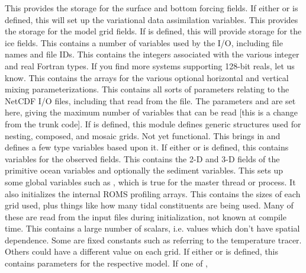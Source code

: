 \begin{klist}
   This
    provides the storage for the surface and bottom forcing fields.
   If either  or 
    is defined, this will set up the variational data assimilation
    variables.
   This provides the storage for the model grid fields. 
   If  is defined, this will provide
    storage for the ice fields.
   This contains a number of variables used by the
    I/O, including file names and file IDs.
    This contains the integers associated with the
    various integer and real Fortran types. If you find more systems
    supporting 128-bit reals, let us know.
   This contains the arrays for the various
    optional horizontal and vertical mixing parameterizations.
   This contains all sorts of parameters relating to
    the NetCDF I/O files, including that read from the 
    file. The parameters  and  are set here, giving
    the maximum number of variables that can be read [this is a change
    from the trunk code].
   If  is defined, this module defines
    generic structures used for nesting, composed, and mosaic grids. Not
    yet functional.
   This brings in  and defines a few
    type variables based upon it.
   If either  or 
    is defined, this contains variables for the observed fields.
   This contains the 2-D and 3-D fields of the primitive
    ocean variables and optionally the sediment variables.
   This sets up some global variables such as
    , which is true for the master thread or
    process. It also initializes the internal ROMS profiling arrays.
   This contains the sizes of each grid used, plus
    things like how many tidal constituents are being used. Many of these are
    read from the input files during initialization, not known at compile
    time.
   This contains a large number of scalars, i.e. values
    which don't have spatial dependence. Some are fixed constants such
    as  referring to the temperature tracer. Others could
    have a different value on each grid.
   If either  or 
    is defined, this contains parameters for the respective model.
   If one of , 

\end{klist}
